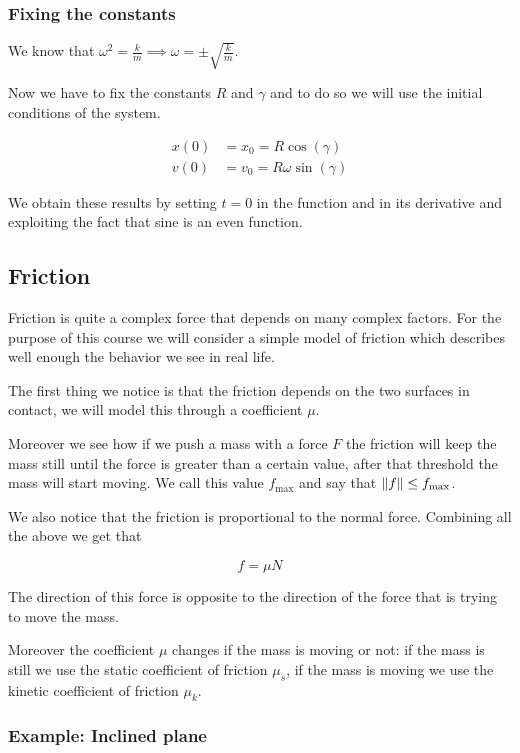 \documentclass[10pt]{extarticle}
\begin{document}
\subsubsection{Fixing the constants}

We know that $\omega^2 = \frac{k}{m} \implies \omega = \pm \sqrt{\frac{k}{m}}$.

Now we have to fix the constants $R$ and $\gamma$ and to do so we will use the initial conditions of the system.

\begin{align*}
  x(0) & = x_0 = R \cos(\gamma)        \\
  v(0) & = v_0 = R \omega \sin(\gamma)
\end{align*}

We obtain these results by setting $t = 0$ in the function and in its derivative and exploiting the fact that sine is an even function.

\subsection{Friction}

Friction is quite a complex force that depends on many complex factors. For the purpose of this course we will consider a simple model of friction which describes well enough the behavior we see in real life.

The first thing we notice is that the friction depends on the two surfaces in contact, we will model this through a coefficient $\mu$.

Moreover we see how if we push a mass with a force $F$ the friction will keep the mass still until the force is greater than a certain value, after that threshold the mass will start moving.
We call this value $f_{\text{max}}$ and say that $\norm{f} \leq f_{\text{max}}$.

We also notice that the friction is proportional to the normal force. Combining all the above we get that

$$
  f = \mu N
$$

The direction of this force is opposite to the direction of the force that is trying to move the mass.

Moreover the coefficient $\mu$ changes if the mass is moving or not: if the mass is still we use the static coefficient of friction $\mu_s$, if the mass is moving we use the kinetic coefficient of friction $\mu_k$.

\subsubsection{Example: Inclined plane}
\end{document}
